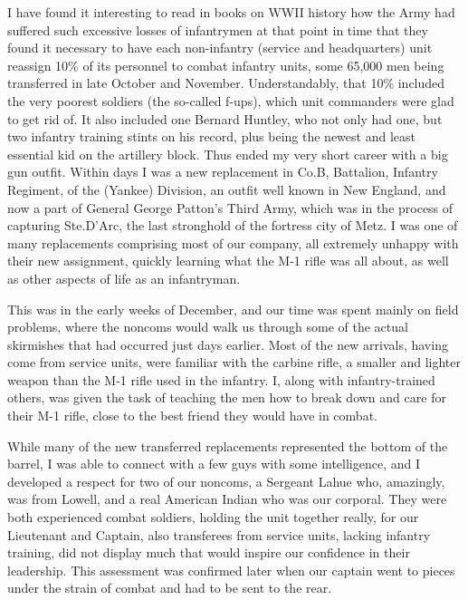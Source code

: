 \documentclass[../m3y]{subfiles}
\begin{document}
I have found it interesting to read in books on WW\thinspace{}II history how the Army had suffered such excessive losses of infantrymen at that point in time that they found it necessary to have each non-infantry (service and headquarters) unit reassign 10\% of its personnel to combat infantry units, some 65,000 men being transferred in late October and November. Understandably, that 10\% included the very poorest soldiers (the so-called f-ups), which unit commanders were glad to get rid of. It also included one Bernard Huntley, who not only had one, but two infantry training stints on his record, plus being the newest and least essential kid on the artillery block. Thus ended my very short career with a big gun outfit. Within days I was a new replacement in Co.\@ B,  Battalion,  Infantry Regiment, of the  (Yankee) Division, an outfit well known in New England, and now a part of General George Patton's Third Army, which was in the process of capturing Ste.\@ D'Arc, the last stronghold of the fortress city of Metz. I was one of many replacements comprising most of our company, all extremely unhappy with their new assignment, quickly learning what the M-1 rifle was all about, as well as other aspects of life as an infantryman.

This was in the early weeks of December, and our time was spent mainly on field problems, where the noncoms would walk us through some of the actual skirmishes that had occurred just days earlier. Most of the new arrivals, having come from service units, were familiar with the carbine rifle, a smaller and lighter weapon than the M-1 rifle used in the infantry. I, along with infantry-trained others, was given the task of teaching the men how to break down and care for their M-1 rifle, close to the best friend they would have in combat.

While many of the new transferred replacements represented the bottom of the barrel, I was able to connect with a few guys with some intelligence, and I developed a respect for two of our noncoms, a Sergeant Lahue who, amazingly, was from Lowell, and a real American Indian who was our corporal. They were both experienced combat soldiers, holding the unit together really, for our Lieutenant and Captain, also transferees from service units, lacking infantry training, did not display much that would inspire our confidence in their leadership. This assessment was confirmed later when our captain went to pieces under the strain of combat and had to be sent to the rear.
\end{document}

